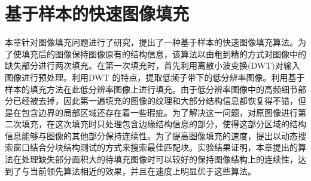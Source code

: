 ﻿\chapter{基于样本的快速图像填充}
 \label{ch3:Inpainting}
 本章针对图像填充问题进行了研究，提出了一种基于样本的快速图像填充算法。为了使填充后的图像保持图像原有的结构信息，该算法以由粗到精的方式对图像中的缺失部分进行两次填充。在第一次填充时，首先利用离散小波变换(DWT)对输入图像进行预处理。利用DWT 的特点，提取低频子带下的低分辨率图像。利用基于样本的填充方法在此低分辨率图像上进行填充。由于低分辨率图像中的高频细节部分已经被去掉，因此第一遍填充的图像的纹理和大部分结构信息都恢复得不错，但是在包含边界的局部区域还存在着一些瑕疵。为了解决这一问题，对原图像进行第二次填充，在这次填充时只处理包含边缘结构信息的部分，使得这部分区域的结构信息能够与图像的其他部分保持连续性。为了提高图像填充的速度，提出以动态搜索窗口结合分块结构测试的方式来搜索最佳匹配块。实验结果证明，本章提出的算法在处理缺失部分面积大的待填充图像时可以较好的保持图像结构上的连续性，达到了与当前领先算法相近的效果，并且在速度上明显优于这些算法。
